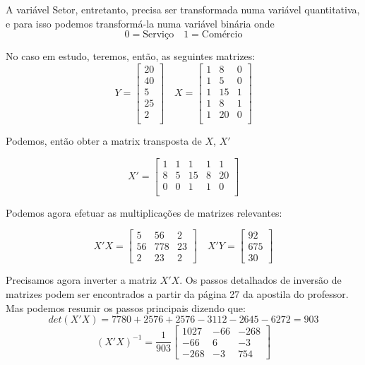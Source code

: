 \documentclass[]{ufpe-exercises}
\begin{document}
\begin{questions}
\begin{parts}
\begin{solution}
			A variável Setor, entretanto, precisa ser transformada numa variável quantitativa, e para isso podemos transformá-la numa variável binária onde
			\[
				0 = \textrm{Serviço} \quad 1 = \textrm{Comércio}
			\]

			No caso em estudo, teremos, então, as seguintes matrizes:
			\[ Y =
				\begin{bmatrix}
					20 \\
					40 \\
					5  \\
					25 \\
					2  \\
				\end{bmatrix} \quad
				X =
				\begin{bmatrix}
					1 & 8  & 0 \\
					1 & 5  & 0 \\
					1 & 15 & 1 \\
					1 & 8  & 1 \\
					1 & 20 & 0 \\
				\end{bmatrix}
			\]

			Podemos, então obter a matrix transposta de \(X\), \(X'\)

			\[ X' =
				\begin{bmatrix}
					1 & 1 & 1  & 1 & 1  \\
					8 & 5 & 15 & 8 & 20 \\
					0 & 0 & 1  & 1 & 0  \\
				\end{bmatrix}
			\]

			Podemos agora efetuar as multiplicações de matrizes relevantes:

			\[
				X'X =
				\begin{bmatrix}
					5  & 56  & 2  \\
					56 & 778 & 23 \\
					2  & 23  & 2
				\end{bmatrix} \quad
				X'Y =
				\begin{bmatrix}
					92  \\
					675 \\
					30
				\end{bmatrix}
			\]

			Precisamos agora inverter a matriz \(X'X\). Os passos detalhados de inversão de matrizes podem ser encontrados a partir da página 27 da apostila do professor. Mas podemos resumir os passos principais dizendo que:
			\[
				\textit{det}(X'X) = 7780 + 2576 + 2576 - 3112 - 2645 - 6272 = 903
			\]
			\[
				(X'X)^{-1} = \frac{1}{903}
				\begin{bmatrix}
					1027 & -66 & -268 \\
					-66  & 6   & -3   \\
					-268 & -3  & 754
				\end{bmatrix}
			\]


\end{solution}
\end{parts}
\end{questions}
\end{document}

